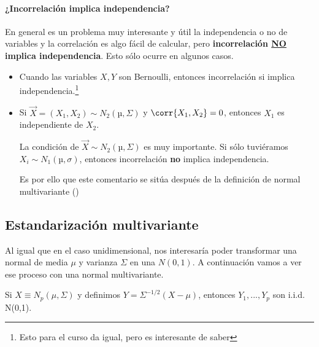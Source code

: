 \paragraph{¿Incorrelación implica independencia?}

En general es un problema muy interesante y útil la independencia o no de variables y la correlación es algo fácil de calcular, pero \textbf{incorrelación \underline{NO} implica independencia}. Esto sólo ocurre en algunos casos.

\begin{itemize}
	\item Cuando las variables $X,Y$ son Bernoulli, entonces incorrelación si implica independencia.\footnote{Esto para el curso da igual, pero es interesante de saber}
	\item Si $\vec{X} = (X_1,X_2) \sim N_2(µ,Σ)$ y $\corr{X_1,X_2} = 0$, entonces $X_1$ es independiente de $X_2$. 

	\subitem La condición de $\vec{X} \sim N_2(µ,Σ)$ es muy importante. Si sólo tuviéramos $X_i \sim N_1(µ,σ)$, entonces incorrelación \textbf{no} implica independencia.

	Es por ello que este comentario se sitúa después de la definición de normal multivariante ()
\end{itemize}




\subsection{Estandarización multivariante}


Al igual que en el caso unidimensional, nos interesaría poder transformar una normal de media $μ$ y varianza $Σ$ en una $N(0,1)$. A continuación vamos a ver ese proceso con una normal multivariante.


\begin{prop} Si $X \equiv N_p(\mu, \Sigma)$ y definimos $Y = \Sigma^{-1/2}(X-\mu)$, entonces $Y_1,...,Y_p$ son i.i.d. N(0,1).\end{prop}


